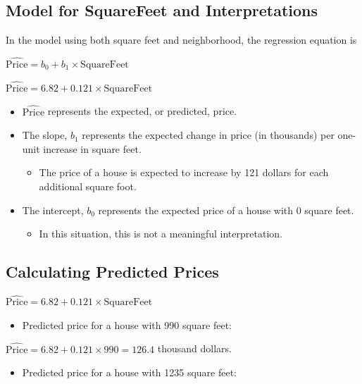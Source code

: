 \documentclass[]{book}
\providecommand{\tightlist}{%
  \setlength{\itemsep}{0pt}\setlength{\parskip}{0pt}}
\begin{document}
\subsection{Model for SquareFeet and
Interpretations}\label{model-for-squarefeet-and-interpretations}

In the model using both square feet and neighborhood, the regression
equation is

\(\widehat{\text{Price}}= b_0+ b_1 \times\text{SquareFeet}\)

\(\widehat{\text{Price}}= 6.82+ 0.121 \times\text{SquareFeet}\)

\begin{itemize}
\item
  \(\widehat{\text{Price}}\) represents the expected, or predicted,
  price.
\item
  The slope, \(b_1\) represents the expected change in price (in
  thousands) per one-unit increase in square feet.

  \begin{itemize}
  \tightlist
  \item
    The price of a house is expected to increase by 121 dollars for each
    additional square foot.
  \end{itemize}
\item
  The intercept, \(b_0\) represents the expected price of a house with 0
  square feet.

  \begin{itemize}
  \tightlist
  \item
    In this situation, this is not a meaningful interpretation.
  \end{itemize}
\end{itemize}

\subsection{Calculating Predicted
Prices}\label{calculating-predicted-prices}

\(\widehat{\text{Price}}= 6.82+ 0.121 \times\text{SquareFeet}\)

\begin{itemize}
\tightlist
\item
  Predicted price for a house with 990 square feet:
\end{itemize}

\(\widehat{\text{Price}}= 6.82+ 0.121 \times990 = 126.4\) thousand
dollars.

\begin{itemize}
\tightlist
\item
  Predicted price for a house with 1235 square feet:
\end{itemize}
\end{document}

